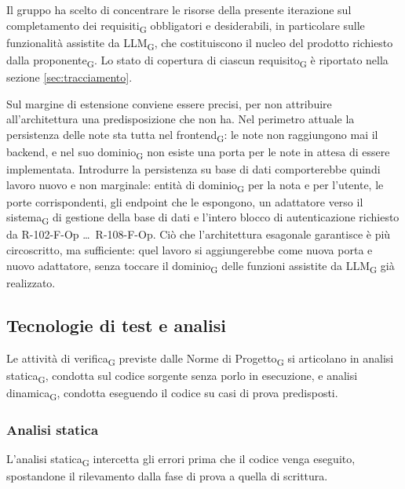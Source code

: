 \documentclass[a4paper, 10pt]{article}
\begin{document}
Il gruppo ha scelto di concentrare le risorse della presente iterazione sul completamento dei requisiti\textsubscript{G} obbligatori e desiderabili, in particolare sulle funzionalità assistite da LLM\textsubscript{G}, che costituiscono il nucleo del prodotto richiesto dalla proponente\textsubscript{G}. Lo stato di copertura di ciascun requisito\textsubscript{G} è riportato nella sezione \ref{sec:tracciamento}.

Sul margine di estensione conviene essere precisi, per non attribuire all'architettura una predisposizione che non ha. Nel perimetro attuale la persistenza delle note sta tutta nel frontend\textsubscript{G}: le note non raggiungono mai il backend, e nel suo dominio\textsubscript{G} non esiste una porta per le note in attesa di essere implementata. Introdurre la persistenza su base di dati comporterebbe quindi lavoro nuovo e non marginale: entità di dominio\textsubscript{G} per la nota e per l'utente, le porte corrispondenti, gli endpoint che le espongono, un adattatore verso il sistema\textsubscript{G} di gestione della base di dati e l'intero blocco di autenticazione richiesto da R-102-F-Op \dots\ R-108-F-Op. Ciò che l'architettura esagonale garantisce è più circoscritto, ma sufficiente: quel lavoro si aggiungerebbe come nuova porta e nuovo adattatore, senza toccare il dominio\textsubscript{G} delle funzioni assistite da LLM\textsubscript{G} già realizzato.

\subsection{Tecnologie di test e analisi}
\label{sec:tecnologie-test}
Le attività di verifica\textsubscript{G} previste dalle Norme di Progetto\textsubscript{G} si articolano in analisi statica\textsubscript{G}, condotta sul codice sorgente senza porlo in esecuzione, e analisi dinamica\textsubscript{G}, condotta eseguendo il codice su casi di prova predisposti.

\subsubsection{Analisi statica}
\label{sec:analisi-statica}
L'analisi statica\textsubscript{G} intercetta gli errori prima che il codice venga eseguito, spostandone il rilevamento dalla fase di prova a quella di scrittura.
\end{document}
